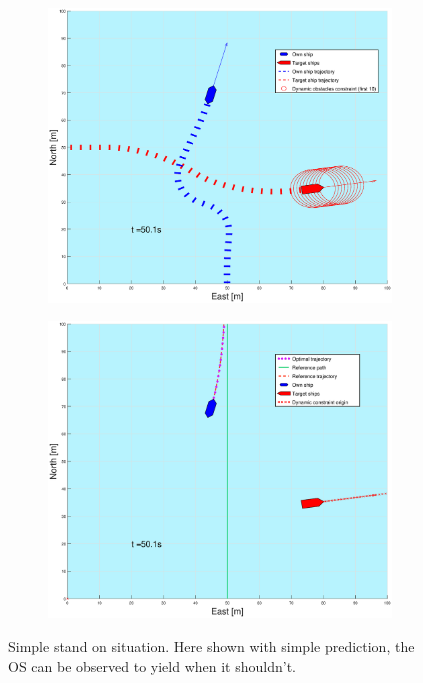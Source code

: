 \begin{figure}[ht!]
\begin{subfigure}[b]{0.499\textwidth}
    \end{subfigure}
    \hfill
    \\
    \begin{subfigure}[b]{0.49\textwidth}
        \centering
        \includegraphics[width=\textwidth]{Images/Figures/enkel_SO/_Simple_1fig1_time=50}
    \end{subfigure}
    \hfill
    \begin{subfigure}[b]{0.499\textwidth}
        \centering
        \includegraphics[width=\textwidth]{Images/Figures/enkel_SO/_Simple_1fig999_time=50}
    \end{subfigure}
    \hfill
    \caption{Simple stand on situation. Here shown with simple prediction, the \gls{OS} can be observed to yield when it shouldn't.}
\end{figure}%
